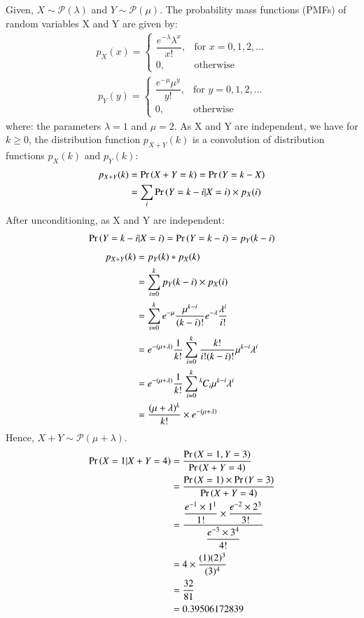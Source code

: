 Given, $X\sim \mathcal P(\lambda)$ and $Y \sim \mathcal P(\mu)$.
The probability mass functions (PMFs) of random variables X and Y are given by:
\begin{align}
  p_X(x) = 
  \begin{cases}
      \dfrac{e^{-\lambda}\lambda^{x}}{x!}, & \text{for } x=0,1,2,\dots\\
    0, & \text{otherwise } 
  \end{cases}
\end{align}
\begin{align}
  p_Y(y) = 
  \begin{cases}
     \dfrac{e^{-\mu}\mu^{y}}{y!}, & \text{for } y=0,1,2,\dots\\
    0, & \text{otherwise } 
  \end{cases}
\end{align}
where: the parameters $\lambda = 1$ and $\mu = 2$.
As X and Y are independent, we have for $k \geq 0$, the distribution function $p_{X+Y}(k)$ is a convolution of distribution functions $p_X(k)$ and $p_Y(k)$: 
\begin{align}
p_{X+Y}(k) &= \Pr\left(X+ Y = k\right) = \Pr\left(Y = k - X\right)\\
&= \sum_{i}\Pr\left(Y = k - i| X=i\right)\times p_X(i)
\end{align}
After unconditioning, as X and Y are independent: 
\begin{align}
\Pr\left(Y = k - i| X=i\right) = \Pr\left(Y = k - i\right) = p_Y(k-i)
\end{align}
\begin{align}
p_{X+Y}(k) &= p_Y(k)*p_X(k)\\ 
    &= \sum_{i=0}^k p_Y(k-i) \times p_X(i)\\
    &= \sum_{i=0}^k e^{-\mu}\frac{\mu^{k-i}}{(k-i)!}e^{-\lambda}\frac{\lambda^i}{i!}\\
   &= e^{-(\mu + \lambda)}\frac 1{k!}\sum_{i=0}^k \frac{k!}{i!(k-i)!}\mu^{k-i}\lambda^i\\
   &= e^{-(\mu + \lambda)}\frac 1{k!}\sum_{i=0}^k {{}^{k}\mkern-1muC_{i}} \mu^{k-i}\lambda^i\\
   &= \frac{(\mu + \lambda)^k}{k!} \times e^{-(\mu + \lambda)}
\end{align}
Hence,  $X+ Y \sim \mathcal P(\mu + \lambda)$.
\begin{align}
\Pr\left(X=1|X+Y=4\right) &= \frac{\Pr\left(X=1, Y=3\right)}{\Pr\left(X+Y=4\right)}\\
&= \frac{\Pr\left(X=1\right) \times \Pr\left(Y=3\right)}{\Pr\left(X+Y=4\right)} \\
&= \frac{\dfrac{e^{-1}\times1^{1}}{1!} \times \dfrac{e^{-2}\times2^{3}}{3!}}{\dfrac{e^{-3}\times3^{4}}{4!}}\\
&= 4 \times \frac{(1)(2)^{3}}{(3)^{4}}\\
&= \frac{32}{81}\\
&= 0.39506172839
\end{align}